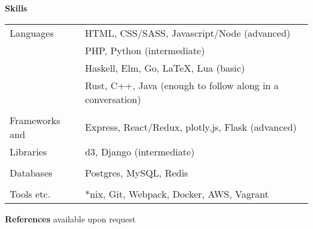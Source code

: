 \documentclass[notitlepage,oneside,draft]{article}
\begin{document}
\begin{flushleft}
  \large
  \textbf{Skills} \\
  \vspace{12pt}
  \normalsize
  \begin{tabular}{ p{86pt} | l  }
    Languages & HTML, CSS/SASS, Javascript/Node (advanced) \\
    & PHP, Python (intermediate) \\
    & Haskell, Elm, Go, LaTeX, Lua (basic) \\
    & Rust, C++, Java (enough to follow along in a conversation) \\
    & \\
    Frameworks and & Express, React/Redux, plotly.js, Flask (advanced) \\
    Libraries & d3, Django (intermediate) \\
    & \\
    Databases & Postgres, MySQL, Redis \\
    & \\
    Tools etc. & *nix, Git, Webpack, Docker, AWS, Vagrant 
  \end{tabular}
  \vspace{24pt}


  \large
  \textbf{References}
  \normalsize
  available upon request

\end{flushleft}
\end{document}
